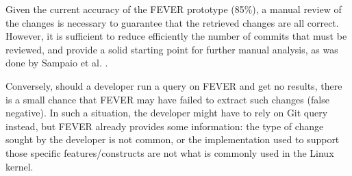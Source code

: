 Given the current accuracy of the FEVER prototype (85\%), a manual review of the changes is necessary to guarantee that the retrieved
changes are all correct. However, it is sufficient to reduce efficiently the number of commits that must be reviewed, and provide a solid starting point
for further manual analysis, as was done by Sampaio et al. \citep{sampaio_partially_2016}.

Conversely, should a developer run a query on FEVER and get no results, there is a small chance that FEVER may have failed to extract such changes (false negative).
In such a situation, the developer might have to rely on Git query instead, but FEVER already provides some information:
the type of change sought by the developer is not common, or the implementation used to support those specific features/constructs are
not what is commonly used in the Linux kernel.










